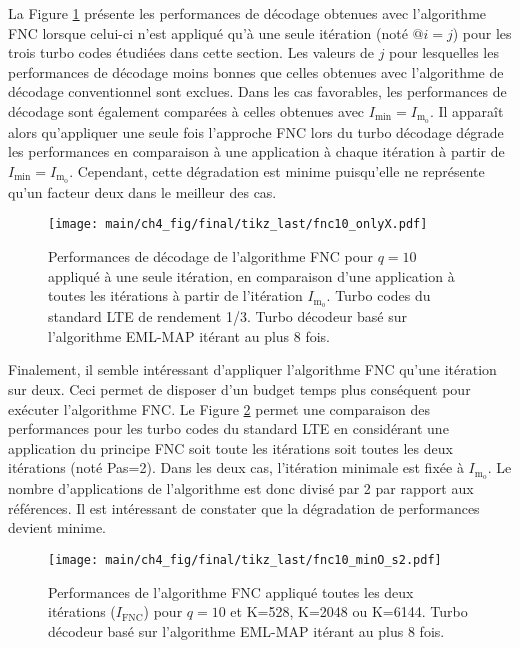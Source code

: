 La Figure 
\ref{fig:fnc_onlyX} présente les performances de décodage obtenues avec l'algorithme FNC lorsque celui-ci n'est appliqué
qu'à une seule itération (noté $@i=j$) pour les trois turbo codes étudiées dans cette section. Les valeurs de $j$ pour lesquelles les performances de décodage moins bonnes que celles 
obtenues avec l'algorithme de décodage conventionnel sont exclues. Dans les cas favorables, les performances de décodage 
sont également comparées à celles obtenues avec $I_\text{min} = I_{\text{m}_\text{o}}$. Il apparaît alors qu'appliquer une 
seule fois l'approche FNC lors du turbo décodage dégrade les performances en comparaison à une application à chaque itération à partir de $I_\text{min}
 = I_{\text{m}_\text{o}}$. Cependant, cette dégradation est minime puisqu'elle ne représente qu'un facteur deux dans le 
 meilleur des cas.

\begin{figure}[!h]
	\centering
	\hspace*{-.1\textwidth}
	\texttt{[image: main/ch4\_fig/final/tikz\_last/fnc10\_onlyX.pdf]}
	\caption{Performances de décodage de l'algorithme FNC pour $q=10$ appliqué à une seule itération, en comparaison
	d'une application à toutes les itérations à partir de l'itération  $I_{\text{m}_\text{o}}$.
	Turbo codes du standard LTE de rendement 1/3. 
	Turbo décodeur basé sur l'algorithme EML-MAP itérant au plus 8 fois.
	\label{fig:fnc_onlyX}}
\end{figure}

Finalement, il semble intéressant d'appliquer l'algorithme FNC qu'une itération sur deux. Ceci permet de disposer d'un budget temps plus conséquent pour exécuter l'algorithme FNC. Le Figure 
\ref{fig:fnc_step} permet une comparaison des performances pour les turbo codes du standard LTE en considérant une application du principe FNC soit toute les itérations 
soit toutes les deux itérations (noté Pas=2). Dans les deux cas, l'itération minimale est fixée à $I_{\text{m}_\text{o}}$. Le nombre d'applications de l'algorithme est donc divisé par 2 par rapport aux références. Il est intéressant de constater  que la dégradation de performances devient minime.

\begin{figure}[!h]
	\centering
	\texttt{[image: main/ch4\_fig/final/tikz\_last/fnc10\_minO\_s2.pdf]}
	\caption{Performances de l'algorithme FNC appliqué toutes les deux itérations ($I_\text{FNC}$) pour $q=10$ et K=528,
	K=2048 ou K=6144.
	Turbo décodeur basé sur l'algorithme EML-MAP itérant au plus 8 fois.
	\label{fig:fnc_step}}
	\vspace*{-1em}
\end{figure}


